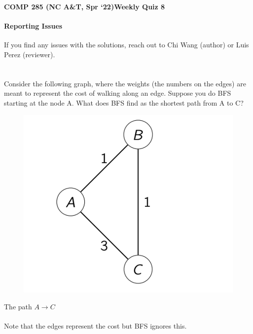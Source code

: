 \documentclass [12pt]{article}
\begin{document}
 

{\LARGE \textbf {COMP 285 (NC A\&T, Spr `22)}\hfill \textbf {Weekly Quiz 8} } 

\begin{Instruction}

\paragraph{Reporting Issues} If you find any issues with the solutions, reach out to Chi Wang (author) or Luis Perez (reviewer).

\end{Instruction}


\section{} Consider the following graph, where the weights (the numbers on the edges) are meant to represent the cost of walking along an edge.
Suppose you do BFS starting at the node A. What does BFS find as the shortest path from A to C?
\begin{figure}[H]
    \centering
    \includegraphics[scale=0.5]{7.png} 
    \label{fig:my_label}
\end{figure}

\begin{Solution}
The path $A \to C$
\paragraph{}
Note that the edges represent the cost but BFS ignores this.
\end{Solution}
\end{document}
